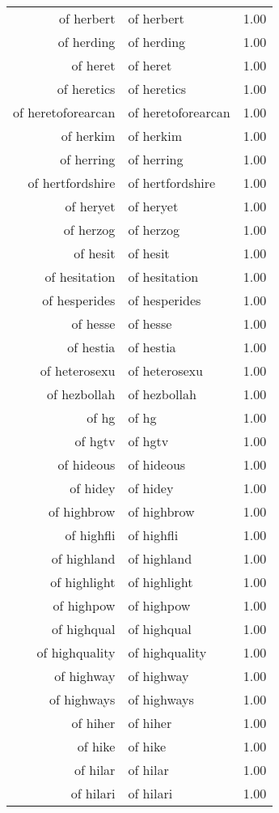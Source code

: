 \begin{table}[ht]
\begin{tabular}{rlr}
  of herbert & of herbert & 1.00 \\ 
  of herding & of herding & 1.00 \\ 
  of heret & of heret & 1.00 \\ 
  of heretics & of heretics & 1.00 \\ 
  of heretoforearcan & of heretoforearcan & 1.00 \\ 
  of herkim & of herkim & 1.00 \\ 
  of herring & of herring & 1.00 \\ 
  of hertfordshire & of hertfordshire & 1.00 \\ 
  of heryet & of heryet & 1.00 \\ 
  of herzog & of herzog & 1.00 \\ 
  of hesit & of hesit & 1.00 \\ 
  of hesitation & of hesitation & 1.00 \\ 
  of hesperides & of hesperides & 1.00 \\ 
  of hesse & of hesse & 1.00 \\ 
  of hestia & of hestia & 1.00 \\ 
  of heterosexu & of heterosexu & 1.00 \\ 
  of hezbollah & of hezbollah & 1.00 \\ 
  of hg & of hg & 1.00 \\ 
  of hgtv & of hgtv & 1.00 \\ 
  of hideous & of hideous & 1.00 \\ 
  of hidey & of hidey & 1.00 \\ 
  of highbrow & of highbrow & 1.00 \\ 
  of highfli & of highfli & 1.00 \\ 
  of highland & of highland & 1.00 \\ 
  of highlight & of highlight & 1.00 \\ 
  of highpow & of highpow & 1.00 \\ 
  of highqual & of highqual & 1.00 \\ 
  of highquality & of highquality & 1.00 \\ 
  of highway & of highway & 1.00 \\ 
  of highways & of highways & 1.00 \\ 
  of hiher & of hiher & 1.00 \\ 
  of hike & of hike & 1.00 \\ 
  of hilar & of hilar & 1.00 \\ 
  of hilari & of hilari & 1.00 \\ 

\end{tabular}
\end{table}

